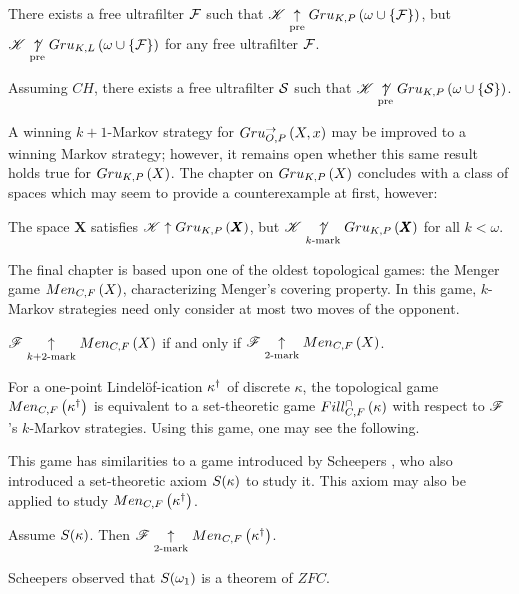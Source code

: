 \begin{thm*}
  There exists a free ultrafilter $\mathcal{F}$ such that
  $\mathscr{K} \underset{\text{pre}}{\uparrow}Gru_{K,P}\left({\omega\cup\{\mathcal{F}\}}\right)$, but
  $\mathscr{K} \underset{\text{pre}}{\not\uparrow}Gru_{K,L}\left({\omega\cup\{\mathcal{F}\}}\right)$ for any free
  ultrafilter $\mathcal{F}$.
\end{thm*}
\begin{thm*}
  Assuming $CH$, there exists a free ultrafilter $\mathcal{S}$ such that
  $\mathscr{K} \underset{\text{pre}}{\not\uparrow}Gru_{K,P}\left({\omega\cup\{\mathcal{S}\}}\right)$.
\end{thm*}

A winning $k+1$-Markov strategy for $Gru_{O,P}^{\to}\left({X},{x}\right)$ may be improved to
a winning Markov strategy; however, it remains open whether this same
result holds true for $Gru_{K,P}\left({X}\right)$. The chapter on $Gru_{K,P}\left({X}\right)$ concludes
with a class of spaces which may seem to provide a counterexample at first,
however:

\begin{thm*}
  The space $\pmb X$ satisfies $\mathscr{K}\uparrow Gru_{K,P}\left({\pmb X}\right)$, but
  $\mathscr{K}\underset{k\text{-mark}}{\not\uparrow}Gru_{K,P}\left({\pmb X}\right)$ for all $k<\omega$.
\end{thm*}

The final chapter is based upon one of the oldest topological games:
the Menger game $Men_{C,F}\left({X}\right)$, characterizing Menger's covering property.
In this game, $k$-Markov strategies need only consider at most
two moves of the opponent.

\begin{thm*}
  $\mathscr{F}\underset{k+2\text{-mark}}{\uparrow}Men_{C,F}\left({X}\right)$ if and only if
  $\mathscr{F}\underset{2\text{-mark}}{\uparrow}Men_{C,F}\left({X}\right)$.
\end{thm*}

For a one-point Lindel\"of-ication $\kappa^\dagger$ of discrete $\kappa$,
the topological game $Men_{C,F}\left({\kappa^\dagger}\right)$ is equivalent to a
set-theoretic game $Fill^{\cap}_{C,F}\left({\kappa}\right)$ with respect to $\mathscr{F}$'s $k$-Markov
strategies. Using this game, one may see the following.

This game has similarities to a game introduced by
Scheepers \cite{MR1129143}, who also introduced a set-theoretic axiom
$S(\kappa)$ to study it. This axiom may also be applied to study
$Men_{C,F}\left({\kappa^\dagger}\right)$.

\begin{thm*}
  Assume $S(\kappa)$. Then
  $\mathscr{F}\underset{2\text{-mark}}{\uparrow}Men_{C,F}\left({\kappa^\dagger}\right)$.
\end{thm*}

Scheepers observed that $S(\omega_1)$ is a theorem of $ZFC$.

